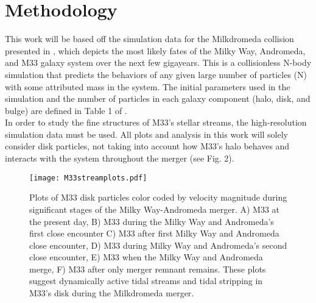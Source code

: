 \documentclass[preprint2]{aastex7}
\begin{document}
\section{Methodology}
This work will be based off the simulation data for the Milkdromeda collision presented in \citep{Marel_Besla_2012}, which depicts the most likely fates of the Milky Way, Andromeda, and M33 galaxy system over the next few gigayears. This is a collisionless N-body simulation that predicts the behaviors of any given large number of particles (N) with some attributed mass in the system. The initial parameters used in the simulation and the number of particles in each galaxy component (halo, disk, and bulge) are defined in Table 1 of \citep{Marel_Besla_2012}.\\
In order to study the fine structures of M33's stellar streams, the high-resolution simulation data must be used. All plots and analysis in this work will solely consider disk particles, not taking into account how M33's halo behaves and interacts with the system throughout the merger (see Fig. 2). 
\begin{figure}[h]
\centering
    \texttt{[image: M33streamplots.pdf]}
    \label{fig:enter-label}
    \caption{Plots of M33 disk particles color coded by velocity magnitude during significant stages of the Milky Way-Andromeda merger. A) M33 at the present day, B) M33 during the Milky Way and Andromeda's  first close encounter C) M33 after first Milky Way and Andromeda close encounter, D) M33 during Milky Way and Andromeda's second close encounter, E) M33 when the Milky Way and Andromeda merge, F) M33 after only merger remnant remains. These plots suggest dynamically active tidal streams and tidal stripping in M33's disk during the Milkdromeda merger.}
\end{figure}
\end{document}
